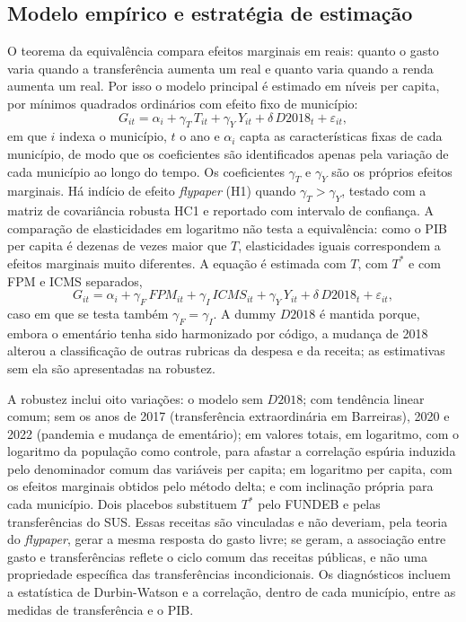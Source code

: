 \subsection{Modelo empírico e estratégia de estimação}

O teorema da equivalência compara efeitos marginais em reais: quanto o gasto varia quando a transferência aumenta um real e quanto varia quando a renda aumenta um real. Por isso o modelo principal é estimado em níveis per capita, por mínimos quadrados ordinários com efeito fixo de município:
\begin{equation}\label{eq:flypaper}
G_{it} = \alpha_i + \gamma_T\, T_{it} + \gamma_Y\, Y_{it} + \delta\, D2018_t + \varepsilon_{it},
\end{equation}
em que $i$ indexa o município, $t$ o ano e $\alpha_i$ capta as características fixas de cada município, de modo que os coeficientes são identificados apenas pela variação de cada município ao longo do tempo. Os coeficientes $\gamma_T$ e $\gamma_Y$ são os próprios efeitos marginais. Há indício de efeito \textit{flypaper} (H1) quando $\gamma_T > \gamma_Y$, testado com a matriz de covariância robusta HC1 e reportado com intervalo de confiança. A comparação de elasticidades em logaritmo não testa a equivalência: como o PIB per capita é dezenas de vezes maior que $T$, elasticidades iguais correspondem a efeitos marginais muito diferentes. A equação é estimada com $T$, com $T^{*}$ e com FPM e ICMS separados,
\begin{equation}\label{eq:decomposicao}
G_{it} = \alpha_i + \gamma_F\, \mathit{FPM}_{it} + \gamma_I\, \mathit{ICMS}_{it} + \gamma_Y\, Y_{it} + \delta\, D2018_t + \varepsilon_{it},
\end{equation}
caso em que se testa também $\gamma_F = \gamma_I$. A dummy $D2018$ é mantida porque, embora o ementário tenha sido harmonizado por código, a mudança de 2018 alterou a classificação de outras rubricas da despesa e da receita; as estimativas sem ela são apresentadas na robustez.

A robustez inclui oito variações: o modelo sem $D2018$; com tendência linear comum; sem os anos de 2017 (transferência extraordinária em Barreiras), 2020 e 2022 (pandemia e mudança de ementário); em valores totais, em logaritmo, com o logaritmo da população como controle, para afastar a correlação espúria induzida pelo denominador comum das variáveis per capita; em logaritmo per capita, com os efeitos marginais obtidos pelo método delta; e com inclinação própria para cada município. Dois placebos substituem $T^{*}$ pelo FUNDEB e pelas transferências do SUS. Essas receitas são vinculadas e não deveriam, pela teoria do \textit{flypaper}, gerar a mesma resposta do gasto livre; se geram, a associação entre gasto e transferências reflete o ciclo comum das receitas públicas, e não uma propriedade específica das transferências incondicionais. Os diagnósticos incluem a estatística de Durbin-Watson e a correlação, dentro de cada município, entre as medidas de transferência e o PIB.


